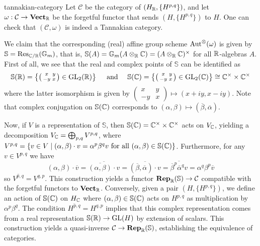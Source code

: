 \begin{example}{tannakian-category}
    Let $\mathcal{C}$ be the category of  $(H_{\mathbb{R}}, \{ H^{p, q} \})$, and let $\omega : \mathcal{C} \to \textbf{Vect}_{\mathbb{R}}$ be the forgetful functor that sends $(H, \{ H^{p, q} \})$ to $H$.
    One can check that $(\mathcal{C}, \omega)$ is indeed a Tannakian category.
    
    We claim that the corresponding (real) affine group scheme $\textup{Aut}^\otimes(\omega)$ is given by $\mathbb{S} = \textup{Res}_{\mathbb{C}/\mathbb{R}}(\mathbb{G}_m)$, that is, $\mathbb{S}(A) = \mathbb{G}_m(A \otimes_{\mathbb{R}} \mathbb{C}) = (A \otimes_{\mathbb{R}} \mathbb{C})^\times$ for all $\mathbb{R}$-algebras $A$. First of all, we see that the real and complex points of $\mathbb{S}$ can be identified as
    \[ \mathbb{S}(\mathbb{R}) = \left\{ \left(\begin{smallmatrix} x & y \\ -y & x \end{smallmatrix}\right) \in \textup{GL}_2(\mathbb{R}) \right\} \quad \textup{ and } \quad \mathbb{S}(\mathbb{C}) = \left\{ \left(\begin{smallmatrix} x & y \\ -y & x \end{smallmatrix}\right) \in \textup{GL}_2(\mathbb{C}) \right\} \cong \mathbb{C}^\times \times \mathbb{C}^\times \]
    where the latter isomorphism is given by $\left(\begin{smallmatrix} x & y \\ -y & x \end{smallmatrix}\right) \mapsto (x + iy, x - iy)$. Note that complex conjugation on $\mathbb{S}(\mathbb{C})$ corresponds to $(\alpha, \beta) \mapsto (\overline{\beta}, \overline{\alpha})$.
    
    Now, if $V$ is a representation of $\mathbb{S}$, then $\mathbb{S}(\mathbb{C}) = \mathbb{C}^\times \times \mathbb{C}^\times$ acts on $V_{\mathbb{C}}$, yielding a decomposition $V_{\mathbb{C}} = \bigoplus_{p, q} V^{p, q}$, where $V^{p, q} = \{ v \in V \mid (\alpha, \beta) \cdot v = \alpha^p \beta^q v \textup{ for all } (\alpha, \beta) \in \mathbb{S}(\mathbb{C}) \}$. Furthermore, for any $v \in V^{p, q}$ we have
    \[ (\alpha, \beta) \cdot \overline{v} = \overline{\overline{(\alpha, \beta)} \cdot v} = \overline{(\overline{\beta}, \overline{\alpha}) \cdot v} = \overline{\overline{\beta}^p \overline{\alpha}^q v} = \alpha^q \beta^p \overline{v} \]
    so $\overline{V^{p, q}} = V^{q, p}$. This construction yields a functor $\textbf{Rep}_{\mathbb{R}}(\mathbb{S}) \to \mathcal{C}$ compatible with the forgetful functors to $\textbf{Vect}_{\mathbb{R}}$.
    Conversely, given a pair $(H, \{ H^{p, q} \})$, we define an action of $\mathbb{S}(\mathbb{C})$ on $H_{\mathbb{C}}$ where $(\alpha, \beta) \in \mathbb{S}(\mathbb{C})$ acts on $H^{p, q}$ as multiplication by $\alpha^p \beta^q$. The condition $\overline{H^{p, q}} = H^{q, p}$ implies that this complex representation comes from a real representation $\mathbb{S}(\mathbb{R}) \to \textup{GL}(H)$ by extension of scalars. This construction yields a quasi-inverse $\mathcal{C} \to \textbf{Rep}_{\mathbb{R}}(\mathbb{S})$, establishing the equivalence of categories.
\end{example}

